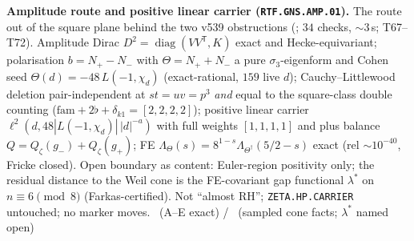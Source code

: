 \par\smallskip\noindent\textbf{Amplitude route and positive linear carrier
(\texttt{RTF.GNS.AMP.01}).}
The route out of the square plane behind the two v539 obstructions
(; $34$ checks, $\sim3$\,s; T67--T72).
Amplitude Dirac $D^2=\operatorname{diag}(VV^{\mathsf T},K)$ exact and
Hecke-equivariant; polarisation $b=N_+-N_-$ with $\Theta=N_++N_-$ a pure
$\sigma_3$-eigenform and Cohen seed $\Theta(d)=-48\,L(-1,\chi_d)$ (exact-rational,
$159$ live $d$); Cauchy--Littlewood deletion pair-independent at $st=uv=p^3$
\emph{and} equal to the square-class double counting
($\mathrm{fam}+2\flat+\delta_{k1}=[2,2,2,2]$); positive linear carrier
$\ell^2(d,48|L(-1,\chi_d)|\,|d|^{-a})$ with full weights $[1,1,1,1]$ and plus
balance $Q=Q_\zeta(g_-)+Q_\zeta(g_+)$; FE
$\Lambda_\Theta(s)=8^{1-s}\Lambda_{\Theta^\dagger}(5/2-s)$ exact
(rel $\sim10^{-40}$, Fricke closed).
Open boundary as content: Euler-region positivity only; the residual distance to
the Weil cone is the FE-covariant gap functional $\lambda^*$ on $n\equiv6\pmod 8$
(Farkas-certified). Not ``almost RH''; \texttt{ZETA.HP.CARRIER} untouched;
no marker moves.
\mE\ (A--E exact) / \mC\ (sampled cone facts; $\lambda^*$ named open)


